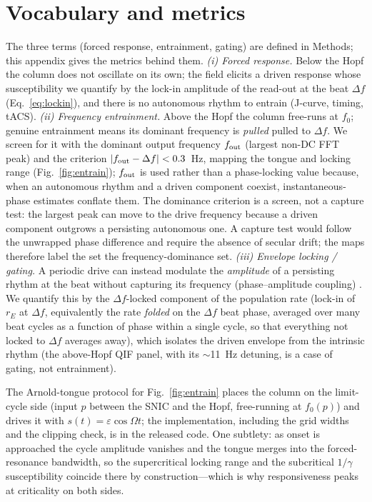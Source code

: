 \documentclass[11pt,a4paper]{article}
\providecommand{\DIFaddtex}[1]{{\protect\color{blue} \sf #1}} %
\providecommand{\DIFdeltex}[1]{{\protect\color{red} \scriptsize #1}} %
\providecommand{\DIFaddbegin}{} %
\providecommand{\DIFaddend}{} %
\providecommand{\DIFdelbegin}{} %
\providecommand{\DIFdelend}{} %
\providecommand{\DIFadd}[1]{\texorpdfstring{\DIFaddtex{#1}}{#1}} %
\providecommand{\DIFdel}[1]{\texorpdfstring{\DIFdeltex{#1}}{}} %
\begin{document}
\section{Vocabulary and metrics}\label{sec:vocab}
The three terms (forced response, entrainment, gating) are defined in Methods; this
appendix gives the metrics behind them.
\emph{(i) Forced response.} Below the Hopf the column does not oscillate on its own; the
field elicits a driven response whose susceptibility we quantify by the lock-in amplitude
of the read-out at the beat $\Delta f$ (Eq.~\eqref{eq:lockin}), and there is no autonomous
rhythm to entrain (J-curve, timing, tACS).
\emph{(ii) Frequency entrainment.} Above the Hopf the column free-runs at $f_0$;
\DIFdelbegin \DIFdel{genuine
}\DIFdelend entrainment means its dominant frequency is \DIFdelbegin \DIFdel{\emph{pulled} }\DIFdelend \DIFaddbegin \DIFadd{pulled }\DIFaddend to $\Delta f$. We screen for it with
the dominant output frequency $f_{\rm out}$ (largest non-DC FFT peak) and the criterion
$|f_{\rm out}-\Delta f|<0.3$~Hz, mapping the tongue and locking range
(Fig.~\ref{fig:entrain}); $f_{\rm out}$ is used rather than a phase-locking value
\cite{lachaux1999} because, when an autonomous rhythm and a driven component coexist,
instantaneous-phase estimates conflate them. The dominance criterion is a screen, not a
capture test: the largest peak can move to the drive frequency because a driven component
outgrows a persisting autonomous one. A capture test would follow the unwrapped phase
difference and require the absence of secular drift; the maps therefore label the set the
frequency-dominance set.
\emph{(iii) Envelope locking / gating.} A periodic drive can instead modulate the
\emph{amplitude} of a persisting rhythm at the beat without capturing its
frequency (phase--amplitude coupling) \cite{canolty2010,tort2010}. We quantify this by
the $\Delta f$-locked component of the population rate (lock-in of $r_E$ at $\Delta f$,
equivalently the rate \emph{folded} on the $\Delta f$ beat phase, averaged over many beat
cycles as a function of phase within a single cycle, so that everything not locked to
$\Delta f$ averages away), which isolates the driven envelope from the intrinsic rhythm (the above-Hopf QIF panel,
with its $\sim$11~Hz detuning, is a case of gating, not entrainment).

The Arnold-tongue protocol for Fig.~\ref{fig:entrain} places the column on the limit-cycle side (input $p$ between the SNIC and the Hopf, free-running at $f_0(p)$) and drives it with $s(t)=\varepsilon\cos\Omega t$; the implementation, including the grid widths and the clipping check, is in the released code. One subtlety: as onset is approached the cycle amplitude vanishes and the tongue merges into the forced-resonance bandwidth, so the supercritical locking range and the subcritical $1/\gamma$ susceptibility coincide there by construction---which is why responsiveness peaks at criticality on both sides.
\end{document}

